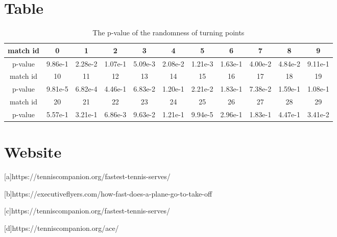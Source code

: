 \documentclass[UTF8]{mcmthesis}
\begin{document}
    \clearpage

    
	

    \clearpage

    \begin{appendices}

    \section{Table}
    \begin{table}[H]
    \small
    \begin{tabular}{|c|c|c|c|c|c|c|c|c|c|c|}
    \hline
    match id & 0       & 1       & 2       & 3       & 4       & 5       & 6       & 7       & 8       & 9       \\ \hline
    p-value  & 9.86e-1 & 2.28e-2 & 1.07e-1 & 5.09e-3 & 2.08e-2 & 1.21e-3 & 1.63e-1 & 4.00e-2 & 4.84e-2 & 9.11e-1 \\ \hline
    match id & 10      & 11      & 12      & 13      & 14      & 15      & 16      & 17      & 18      & 19      \\ \hline
    p-value  & 9.81e-5 & 6.82e-4 & 4.46e-1 & 6.83e-2 & 1.20e-1 & 2.21e-2 & 1.83e-1 & 7.38e-2 & 1.59e-1 & 1.08e-1 \\ \hline
    match id & 20      & 21      & 22      & 23      & 24      & 25      & 26      & 27      & 28      & 29      \\ \hline
    p-value  & 5.57e-1 & 3.21e-1 & 6.86e-3 & 9.63e-2 & 1.21e-1 & 9.94e-5 & 2.96e-1 & 1.83e-1 & 4.47e-1 & 3.41e-2 \\ \hline
    \end{tabular}
    \caption{The p-value of the randomness of turning points}
    \label{tab:appendices1}
    \end{table}
    
    \section{Website}
    \noindent

    [a]https://tenniscompanion.org/fastest-tennis-serves/ 
    
    [b]https://executiveflyers.com/how-fast-does-a-plane-go-to-take-off
    
    [c]https://tenniscompanion.org/fastest-tennis-serves/
    
    [d]https://tenniscompanion.org/ace/
    

\end{appendices}
\end{document}
